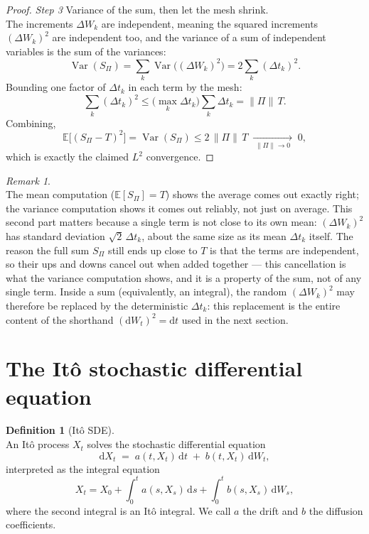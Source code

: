 \documentclass[11pt]{report}
\newcommand{\E}{\mathbb{E}}
\newcommand{\Var}{\operatorname{Var}}
\newcommand{\dd}{\mathrm{d}}
\newcommand{\dW}{\dd W_t}
\newcommand{\dt}{\dd t}
\newcommand{\drift}{a}
\newcommand{\diff}{b}
\theoremstyle{plain}
\theoremstyle{definition}
\newtheorem{definition}{Definition}[chapter]
\theoremstyle{remark}
\newtheorem{remark}{Remark}[chapter]
\numberwithin{equation}{chapter}
\begin{document}
\begin{proof}
\medskip
\noindent\emph{Step 3}\; Variance of the sum, then let the mesh shrink.
\\
The increments $\Delta W_k$ are independent, meaning the squared increments
$(\Delta W_k)^2$ are independent too, and the variance of a sum of
independent variables is the sum of the variances:
\[
  \Var(S_\Pi)=\sum_k \Var\big((\Delta W_k)^2\big)=2\sum_k (\Delta t_k)^2 .
\]
Bounding one factor of $\Delta t_k$ in each term by the mesh:
\[
  \sum_k (\Delta t_k)^2 \le \Big(\max_k \Delta t_k\Big)\sum_k \Delta t_k
                        = \|\Pi\|\,T .
\]
Combining,
\[
  \E\big[(S_\Pi-T)^2\big]=\Var(S_\Pi)\le 2\,\|\Pi\|\,T
  \;\xrightarrow[\;\|\Pi\|\to0\;]{}\;0 ,
\]
which is exactly the claimed $L^2$ convergence.
\end{proof}

\begin{remark}
\leavevmode\\
The mean computation ($\E[S_\Pi]=T$) shows the average comes out
exactly right; the variance computation shows it comes out reliably,
not just on average. This second part matters because a single term
is not close to its own mean: $(\Delta W_k)^2$ has standard deviation
$\sqrt2\,\Delta t_k$, about the same size as its mean $\Delta t_k$
itself. The reason the full sum $S_\Pi$ still ends up close to $T$ is
that the terms are independent, so their ups and downs cancel out
when added together --- this cancellation is what the variance
computation shows, and it is a property of the sum, not of any single
term. Inside a sum (equivalently, an integral), the random
$(\Delta W_k)^2$ may therefore be replaced by the deterministic
$\Delta t_k$: this replacement is the entire content of the shorthand
$(\dW)^2=\dt$ used in the next section.
\end{remark}

\section{The It\^o stochastic differential equation}

\begin{definition}[It\^o SDE]
\leavevmode\\
An It\^o process $X_t$ solves the stochastic differential equation
\begin{equation}\label{eq:sde}
   \dd X_t \;=\; \drift(t,X_t)\,\dt \;+\; \diff(t,X_t)\,\dW,
\end{equation}
interpreted as the integral equation
\[
   X_t = X_0 + \int_0^t \drift(s,X_s)\,\dd s
              + \int_0^t \diff(s,X_s)\,\dd W_s,
\]
where the second integral is an It\^o integral. We call $\drift$ the
drift and $\diff$ the diffusion coefficients.
\end{definition}
\end{document}

